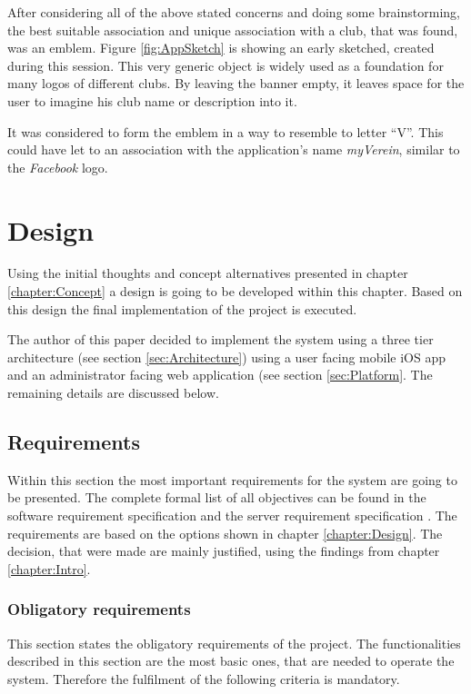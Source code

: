 After considering all of the above stated concerns and doing some brainstorming, the best suitable association and unique association with a club, that was found, was an emblem. Figure \vref{fig:AppSketch} is showing an early sketched, created during this session. This very generic object is widely used as a foundation for many logos of different clubs. By leaving the banner empty, it leaves space for the user to imagine his club name or description into it. 

It was considered to form the emblem in a way to resemble to letter \enquote{V}. This could have let to an association with the application's name \emph{myVerein}, similar to the \emph{Facebook} logo. 

\chapter{Design}
\label{chapter:Design}

Using the initial thoughts and concept alternatives presented in chapter \vref{chapter:Concept} a design is going to be developed within this chapter. Based on this design the final implementation of the project is executed.

The author of this paper decided to implement the system using a three tier architecture (see section \vref{sec:Architecture}) using a user facing mobile iOS app and an administrator facing web application (see section \vref{sec:Platform}. The remaining details are discussed below.

\section{Requirements}
\label{sec:Requirements}
Within this section the most important requirements for the system are going to be presented. The complete formal list of all objectives can be found in the software requirement specification \cite{Steiler:2014aa} and the server requirement specification \cite{Steiler:2014ab}. The requirements are based on the options shown in chapter \vref{chapter:Design}. The decision, that were made are mainly justified, using the findings from chapter \vref{chapter:Intro}.

\subsection{Obligatory requirements} %
\label{sec:ObligatoryReq}

This section states the obligatory requirements of the project. The functionalities described in this section are the most basic ones, that are needed to operate the system. Therefore the fulfilment of the following criteria is mandatory.

